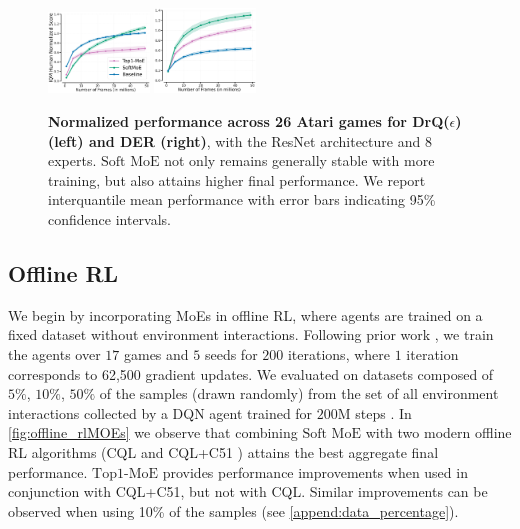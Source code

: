 \documentclass{article}
\theoremstyle{plain}
\theoremstyle{definition}
\theoremstyle{remark}
\newcommand{\moe}{$\textrm{Top1-MoE}$}
\newcommand{\softmoe}{$\textrm{Soft MoE}$}
\begin{document}
\ifarxiv
    \begin{figure}[!t]
        \centering
        \includegraphics[width=0.24\textwidth]{figures/DrQ_eps_8CORRCOLOR.pdf}%
        \includegraphics[width=0.24\textwidth]{figures/DER_8CORRCOLOR.pdf}%
        \caption{\textbf{Normalized performance across 26 Atari games for DrQ($\epsilon$) (left) and DER (right)}, with the ResNet architecture \citep{espeholt2018impala} and 8 experts. \softmoe{} not only remains generally stable with more training, but also attains higher final performance. We report interquantile mean performance with error bars indicating 95\% confidence intervals.}
        \label{fig:samplefficiency}
    \end{figure}
\fi

\subsection{Offline RL}\label{sec:offline_rl}
We begin by incorporating MoEs in offline RL, where agents are trained on a fixed dataset without environment interactions. Following prior work \citep{kumar2021dr3}, we train the agents over $17$ games and $5$ seeds for $200$ iterations, where $1$ iteration
corresponds to 62,500 gradient updates. We evaluated on datasets composed of $5\%$, $10\%$, $50\%$  of the samples (drawn randomly) from the set of all environment interactions collected by a DQN agent trained for $200$M steps \citep{agarwal2020optimistic}. In \cref{fig:offline_rlMOEs} we observe that combining \softmoe{} with two modern offline RL algorithms (CQL \citep{kumar2020conservative} and CQL+C51 \citep{kumar2022offline}) attains the best aggregate final performance. \moe{} provides performance improvements when used in conjunction with CQL+C51, but not with CQL. Similar improvements can be observed when using 10\% of the samples (see \cref{append:data_percentage}).%
\end{document}
